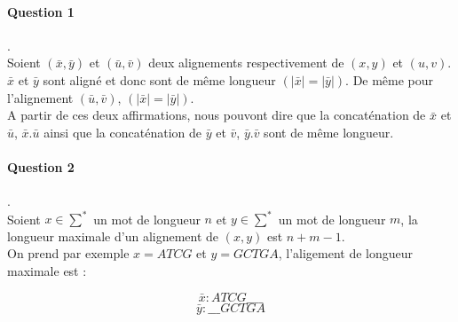 \paragraph{Question 1}.\\
Soient $(\bar x,\bar y)$ et $(\bar u, \bar v)$ deux alignements respectivement de $(x, y)$ et $(u, v)$. $\bar x$ et $\bar y$ sont aligné et donc sont de même longueur $(|\bar x| = |\bar y|)$. De même pour l'alignement $(\bar u, \bar v)$, $(|\bar x| = |\bar y|)$.\\
A partir de ces deux affirmations, nous pouvont dire que la concaténation de $\bar x$ et $\bar u$, $\bar x.\bar u$ ainsi que la concaténation de $\bar y$ et $\bar v$, $\bar y.\bar v$ sont de même longueur.

\paragraph{Question 2}.\\
Soient $x \in \sum^*$ un mot de longueur $n$ et $y \in \sum^*$ un mot de longueur $m$, la longueur maximale d'un alignement de $(x,y)$ est $n+m-1$.\\
On prend par exemple $x=ATCG$ et $y=GCTGA$, l'aligement de longueur maximale est :

$$\bar x : ATCG\_\_\_\_$$
$$\bar y : \_\_\_GCTGA$$
